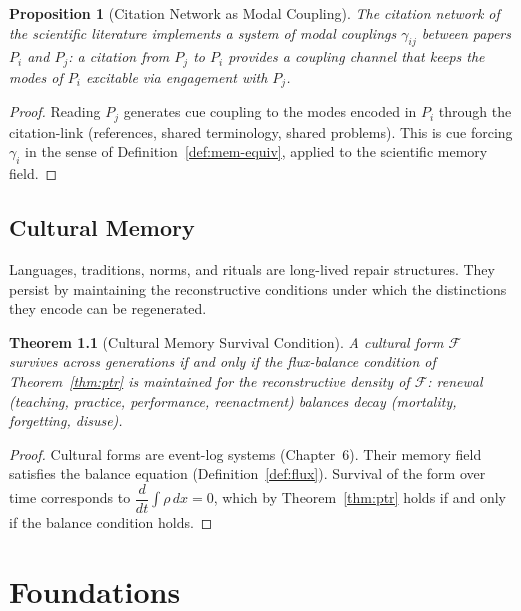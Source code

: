 \documentclass[12pt, oneside]{book}
\theoremstyle{plain}
\newtheorem{theorem}{Theorem}[chapter]
\newtheorem{proposition}[theorem]{Proposition}
\theoremstyle{definition}
\theoremstyle{remark}
\begin{document}
\begin{proposition}[Citation Network as Modal Coupling]
The citation network of the scientific literature
implements a system of modal couplings $\gamma_{ij}$
between papers $P_i$ and $P_j$:
a citation from $P_j$ to $P_i$ provides a coupling
channel that keeps the modes of $P_i$ excitable
via engagement with $P_j$.
\end{proposition}

\begin{proof}
Reading $P_j$ generates cue coupling to the modes
encoded in $P_i$ through the citation-link
(references, shared terminology, shared problems).
This is cue forcing $\gamma_i$ in the sense of
Definition~\ref{def:mem-equiv}, applied to the
scientific memory field.
\end{proof}

\chapter{Cultural Memory}

Languages, traditions, norms, and rituals are long-lived
repair structures.
They persist by maintaining the reconstructive conditions
under which the distinctions they encode can be
regenerated.

\begin{theorem}[Cultural Memory Survival Condition]
A cultural form $\mathcal{F}$ survives across generations
if and only if the flux-balance condition of
Theorem~\ref{thm:ptr} is maintained for the reconstructive
density of $\mathcal{F}$: renewal (teaching, practice,
performance, reenactment) balances decay (mortality,
forgetting, disuse).
\end{theorem}

\begin{proof}
Cultural forms are event-log systems (Chapter~6).
Their memory field satisfies the balance equation
(Definition~\ref{def:flux}).
Survival of the form over time corresponds to
$\dfrac{d}{dt}\displaystyle\int \rho\,dx = 0$,
which by Theorem~\ref{thm:ptr} holds if and only if
the balance condition holds.
\end{proof}

\part{Foundations}
\end{document}
